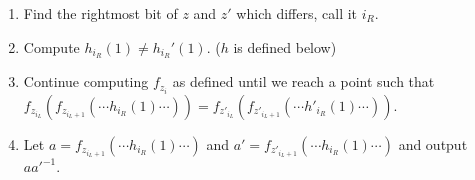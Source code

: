 \documentclass{article}
\begin{document}
\begin{enumerate}
\begin{enumerate}[,label=\alph*.]
\begin{enumerate}[noitemsep,topsep=\mdcompacttopsep]
\item{}Find the rightmost bit of $z$ and $z'$ which differs, call it $i_R$.%

\item{}Compute $h_{i_R}(1) \neq h_{i_R}'(1)$. ($h$ is defined below)%

\item{}Continue computing $f_{z_i}$ as defined until we reach a point such that
$f_{z_{i_L}}(f_{z_{i_L+1}}(\cdots h_{i_R}(1)\cdots)) = f_{z'_{i_L}}(f_{z'_{i_L+1}}(\cdots h'_{i_R}(1)\cdots))$.%

\item{}Let $a = f_{z_{i_L+1}}(\cdots h_{i_R}(1)\cdots)$ and $a' = f_{z'_{i_L+1}}(\cdots h_{i_R}(1)\cdots)$
and output $aa'^{-1}$.%
\end{enumerate}%


\end{enumerate}
\end{enumerate}
\end{document}
